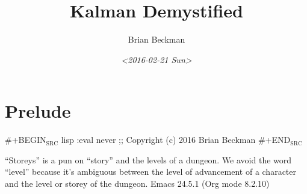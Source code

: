 \documentclass[10pt,oneside,x11names]{article}
\author{Brian Beckman}
\date{\textit{<2016-02-21 Sun>}}
\title{Kalman Demystified}
\begin{document}
\maketitle
\setcounter{tocdepth}{2}
\tableofcontents


\section{Prelude}
\label{sec:orgheadline1}

\#+BEGIN\(_{\text{SRC}}\) lisp :eval never
  ;; Copyright (c) 2016 Brian Beckman \#+END\(_{\text{SRC}}\)

``Storeys'' is a pun on ``story'' and the levels of a dungeon. We avoid the word
``level'' because it's ambiguous between the level of advancement of a character
and the level or storey of the dungeon.
Emacs 24.5.1 (Org mode 8.2.10)
\end{document}

